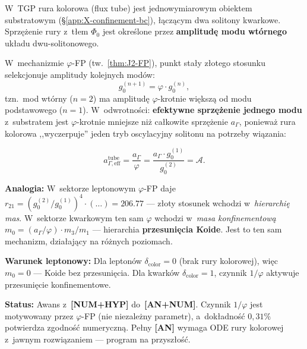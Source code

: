 \begin{proposition}%
\label{prop:X-phi-color-tube}
W~TGP rura kolorowa (flux tube) jest jednowymiarowym
obiektem substratowym (\S\ref{app:X-confinement-bc}),
\l{}\k{a}cz\k{a}cym dwa solitony kwarkowe.
Sprz\k{e}\.zenie rury z~t\l{}em $\Phi_0$ jest okre\'slone
przez \textbf{amplitud\k{e} modu wt\'ornego} uk\l{}adu
dwu-solitonowego.

W~mechanizmie $\varphi$-FP (tw.~\ref{thm:J2-FP}), punkt sta\l{}y
z\l{}otego stosunku selekcjonuje amplitudy kolejnych mod\'ow:
\begin{equation}\label{eq:X-phi-mode-sequence}
  g_0^{(n+1)} = \varphi \cdot g_0^{(n)},
\end{equation}
tzn.\ mod wt\'orny ($n{=}2$) ma amplitud\k{e} $\varphi$-krotnie
wi\k{e}ksz\k{a} od modu podstawowego ($n{=}1$).
W~odwrotno\'sci: \textbf{efektywne sprz\k{e}\.zenie jednego modu}
z~substratem jest $\varphi$-krotnie mniejsze ni\.z ca\l{}kowite
sprz\k{e}\.zenie $a_\Gamma$, poniewa\.z rura kolorowa ,,wyczerpuje''
jeden tryb oscylacyjny solitonu na potrzeby wi\k{a}zania:

\begin{equation}\label{eq:X-a-eff-tube}
  a_{\Gamma,\mathrm{eff}}^{\mathrm{tube}}
  = \frac{a_\Gamma}{\varphi}
  = \frac{a_\Gamma \cdot g_0^{(1)}}{g_0^{(2)}}
  = \mathcal{A}.
\end{equation}

\textbf{Analogia:} W~sektorze leptonowym $\varphi$-FP daje
$r_{21} = (g_0^{(2)}/g_0^{(1)})^4 \cdot (\ldots) = 206.77$
--- z\l{}oty stosunek wchodzi w~\emph{hierarchi\k{e} mas}.
W~sektorze kwarkowym ten sam $\varphi$ wchodzi
w~\emph{masa konfinementow\k{a}} $m_0 = (a_\Gamma/\varphi)
\cdot m_3/m_1$ --- hierarchia \textbf{przesuni\k{e}cia Koide}.
Jest to ten sam mechanizm, dzia\l{}aj\k{a}cy na r\'o\.znych
poziomach.

\medskip\noindent\textbf{Warunek leptonowy:}
Dla lepton\'ow $\delta_{\mathrm{color}} = 0$ (brak rury kolorowej),
wi\k{e}c $m_0 = 0$ --- Koide bez przesuni\k{e}cia.
Dla kwark\'ow $\delta_{\mathrm{color}} = 1$, czynnik $1/\varphi$
aktywuje przesuni\k{e}cie konfinementowe.

\medskip\noindent\textbf{Status:}
Awans z~\textbf{[NUM+HYP]} do~\textbf{[AN+NUM]}.
Czynnik $1/\varphi$ jest motywowany przez $\varphi$-FP
(nie niezale\.zny parametr), a~dok\l{}adno\'s\'c
$0{,}31\%$ potwierdza zgodno\'s\'c numeryczn\k{a}.
Pe\l{}ny \textbf{[AN]} wymaga ODE rury kolorowej
z~jawnym rozwi\k{a}zaniem --- program na przysz\l{}o\'s\'c.
\end{proposition}


